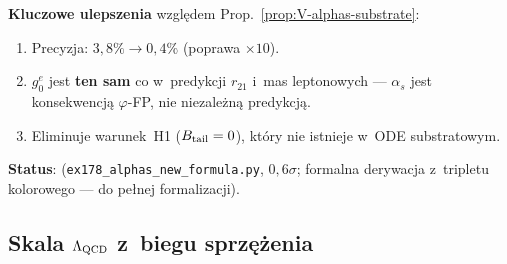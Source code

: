 \begin{remark}[Aktualizacja: nowa formu\l{}a $\alpha_s$ z~ODE substratowym
$\alpha = 1$ (sesja~v45)]
\textbf{Kluczowe ulepszenia} wzgl\k{e}dem Prop.~\ref{prop:V-alphas-substrate}:
\begin{enumerate}[nosep]
  \item Precyzja: $3{,}8\% \to 0{,}4\%$ (poprawa $\times 10$).
  \item $g_0^e$ jest \textbf{ten sam} co w~predykcji $r_{21}$
    i~mas leptonowych --- $\alpha_s$ jest konsekwencj\k{a}
    $\varphi$-FP, nie niezale\.zn\k{a} predykcj\k{a}.
  \item Eliminuje warunek~H1 ($B_{\rm tail} = 0$), kt\'ory nie
    istnieje w~ODE substratowym.
\end{enumerate}

\textbf{Status}: 
(\texttt{ex178\_alphas\_new\_formula.py}, $0{,}6\sigma$;
formalna derywacja z~tripletu kolorowego --- do pe\l{}nej
formalizacji).
\end{remark}

\subsection{Skala $\Lambda_{\rm QCD}$ z~biegu sprz\k{e}\.zenia}%
\label{app:V-LambdaQCD}

